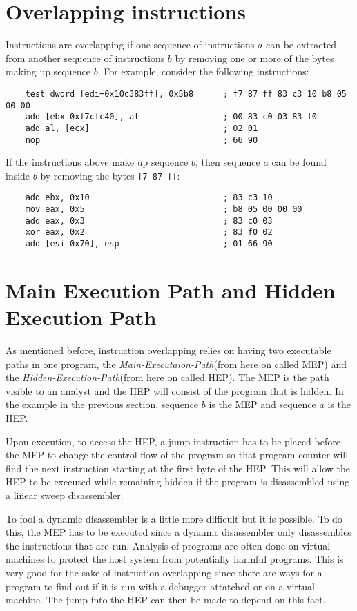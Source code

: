 \documentclass[11pt,twoside]{eitExjobb}
\begin{document}
\section{Overlapping instructions}
Instructions are overlapping if one sequence of instructions $a$ can be extracted from another sequence of instructions $b$ by removing one or more of the bytes making up sequence $b$. For example, consider the following instructions:

\begin{verbatim}
    test dword [edi+0x10c383ff], 0x5b8      ; f7 87 ff 83 c3 10 b8 05 00 00
    add [ebx-0xf7cfc40], al                 ; 00 83 c0 03 83 f0
    add al, [ecx]                           ; 02 01
    nop                                     ; 66 90
\end{verbatim}

\noindent If the instructions above make up sequence $b$, then sequence $a$ can be found inside $b$ by removing the bytes \texttt{f7 87 ff}:

\begin{verbatim}
    add ebx, 0x10                           ; 83 c3 10
    mov eax, 0x5                            ; b8 05 00 00 00
    add eax, 0x3                            ; 83 c0 03
    xor eax, 0x2                            ; 83 f0 02
    add [esi-0x70], esp                     ; 01 66 90
\end{verbatim}

\section{Main Execution Path and Hidden Execution Path} 
As mentioned before, instruction overlapping relies on having two executable paths in one program, the \emph{Main-Executaion-Path}(from here on called MEP) and the \emph{Hidden-Execution-Path}(from here on called HEP). The MEP is the path visible to an analyst and the HEP will consist of the program that is hidden. In the example in the previous section, sequence $b$ is the MEP and sequence $a$ is the HEP.

Upon execution, to access the HEP, a jump instruction has to be placed before the MEP to change the control flow of the program so that program counter will find the next instruction starting at the first byte of the HEP. This will allow the HEP to be executed while remaining hidden if the program is disassembled using a linear sweep disassembler. 

To fool a dynamic disassembler is a little more difficult but it is possible. To do this, the MEP has to be executed since a dynamic disassembler only disassembles the instructions that are run. Analysis of programs are often done on virtual machines to protect the host system from potentially harmful programs. This is very good for the sake of instruction overlapping since there are ways for a program to find out if it is run with a debugger attatched or on a virtual machine. The jump into the HEP can then be made to depend on this fact.
\end{document}
